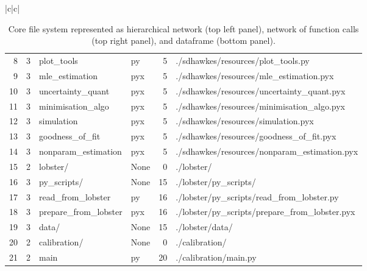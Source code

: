 \documentclass[10pt, article,table]{article}
\begin{document}
\begin{center}
\begin{table}
\begin{tabular}{|c|c|}
{\begin{scriptsize}
{\begin{tabular}{rrllrl}
 8 &      3 &            plot\_tools &        py &       5 &            ./sdhawkes/resources/plot\_tools.py \\  9 &      3 &        mle\_estimation &       pyx &       5 &       ./sdhawkes/resources/mle\_estimation.pyx \\ 10 &      3 &     uncertainty\_quant &       pyx &       5 &    ./sdhawkes/resources/uncertainty\_quant.pyx \\ 11 &      3 &     minimisation\_algo &       pyx &       5 &    ./sdhawkes/resources/minimisation\_algo.pyx \\ 12 &      3 &            simulation &       pyx &       5 &           ./sdhawkes/resources/simulation.pyx \\ 13 &      3 &       goodness\_of\_fit &       pyx &       5 &      ./sdhawkes/resources/goodness\_of\_fit.pyx \\ 14 &      3 &   nonparam\_estimation &       pyx &       5 &  ./sdhawkes/resources/nonparam\_estimation.pyx \\ 15 &      2 &               lobster/ &      None &       0 &                                    ./lobster/ \\ 16 &      3 &            py\_scripts/ &      None &      15 &                         ./lobster/py\_scripts/ \\ 17 &      3 &     read\_from\_lobster &        py &      16 &     ./lobster/py\_scripts/read\_from\_lobster.py \\ 18 &      3 &  prepare\_from\_lobster &       pyx &      16 &  ./lobster/py\_scripts/prepare\_from\_lobster.pyx \\ 19 &      3 &                  data/ &      None &      15 &                               ./lobster/data/ \\ 20 &      2 &           calibration/ &      None &       0 &                                ./calibration/ \\ 21 &      2 &                  main &        py &      20 &                         ./calibration/main.py  \\
 \hline
 \end{tabular}
 }
 \end{scriptsize}
 }
 \\
 \bottomrule
\end{tabular}
\label{tab.filesystem}
\caption{Core file system represented as hierarchical network (top left panel), network of function calls (top right panel), and dataframe (bottom panel).}
\end{table}
\end{center}
\end{document}
